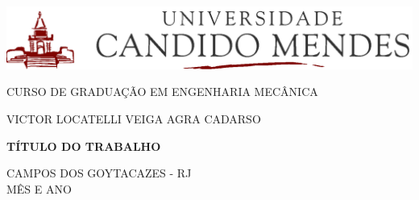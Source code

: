 \begin{titlepage}
    \begin{center}
        \includegraphics[width=1.0\textwidth]{figuras/ucam-header.png}

        \uppercase{Curso de graduação em engenharia mecânica}


        \vspace{1.64cm}

        \normalsize\uppercase{
            Victor Locatelli Veiga Agra Cadarso
            }

        \vspace{5cm}

        \uppercase{\large{\textbf{título do trabalho}}}

        \vfill


        \normalsize
        \uppercase{
        Campos dos Goytacazes - RJ
        \\
        Mês e ano
        }

    \end{center}
\end{titlepage}
